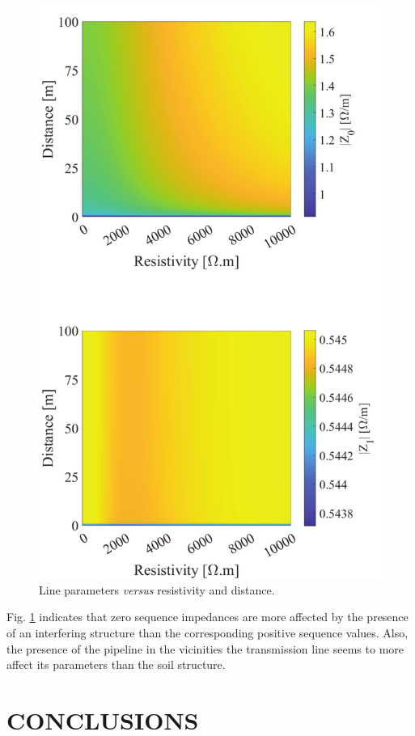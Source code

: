 \documentclass[conference]{IEEEtran}
\begin{document}
	
	\begin{figure}[hbt]
		\begin{center}
			\includegraphics[width=.8\columnwidth]{fig/Impedance2.pdf}
			\caption{Line parameters \textit{versus} resistivity and distance.}
			\label{fig:Impedance}
		\end{center}
	\end{figure}
	
	Fig. \ref{fig:Impedance} indicates that zero sequence impedances are more affected by the presence of an interfering structure than the corresponding positive sequence values. Also, the presence of the pipeline in the vicinities the transmission line seems to more affect its parameters than the soil structure.
	
	\section{CONCLUSIONS}
	
\end{document}
